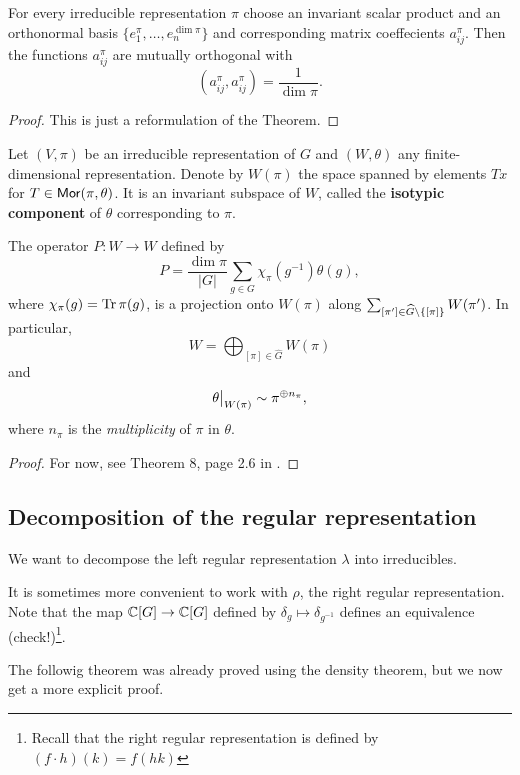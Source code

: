 \documentclass[11pt, english]{article}
\begin{document}
\begin{thm}
 For every irreducible representation $\pi$ choose an invariant scalar product and an orthonormal basis $\{e_1^\pi, \ldots, e_n^{\dim \pi}\}$ and corresponding matrix coeffecients $a_{ij}^\pi$. Then the functions $a_{ij}^\pi$ are mutually orthogonal with
$$
\left (a_{ij}^\pi, a_{ij}^\pi\right) = \frac{1}{\dim \pi}.
$$
\end{thm}
\begin{proof}
This is just a reformulation of the Theorem. 
\end{proof}

Let $(V,\pi)$ be an irreducible representation of $G$ and $(W,\theta)$ any finite-dimensional representation. Denote by $W(\pi)$ the space spanned by elements $Tx$ for $T \in \mathsf{Mor}(\pi,\theta)$. It is an invariant subspace of $W$, called the \textbf{isotypic component} of $\theta$ corresponding to $\pi$. 


\begin{lemma}
The operator $P:W \to W$ defined by
$$
P = \frac{\dim \pi}{\lvert G \rvert} \sum_{g \in G} \chi_\pi(g^{-1})\theta(g),
$$
where $\chi_\pi(g)=\operatorname{Tr} \pi(g)$, is a projection onto $W(\pi)$ along $\sum_{[\pi'] \in  \widehat G  \backslash \{ [\pi] \}} W(\pi')$. In particular, $$
W = \bigoplus_{[\pi] \in \widehat G} W(\pi)
$$
and 
$$
\restr{\theta}{W(\pi)} \sim \pi^{\oplus n_\pi},
$$
where $n_\pi$ is the \emph{multiplicity} of $\pi$ in $\theta$.
\end{lemma}

\begin{proof}
For now, see Theorem 8, page 2.6 in \cite{serre_linrep}.
\end{proof}

\subsection{Decomposition of the regular representation}

We want to decompose the left regular representation $\lambda$ into irreducibles.

It is sometimes more convenient to work with $\rho$, the right regular representation. Note that the map $\mathbb{C}[G] \to \mathbb{C}[G]$ defined by $\delta_g \mapsto \delta_{g^{-1}}$ defines an equivalence (check!)\footnote{Recall that the right regular representation is defined by $(f \cdot h )(k) = f(hk)$}. 

The followig theorem was already proved using the density theorem, but we now get a more explicit proof.
\end{document}
